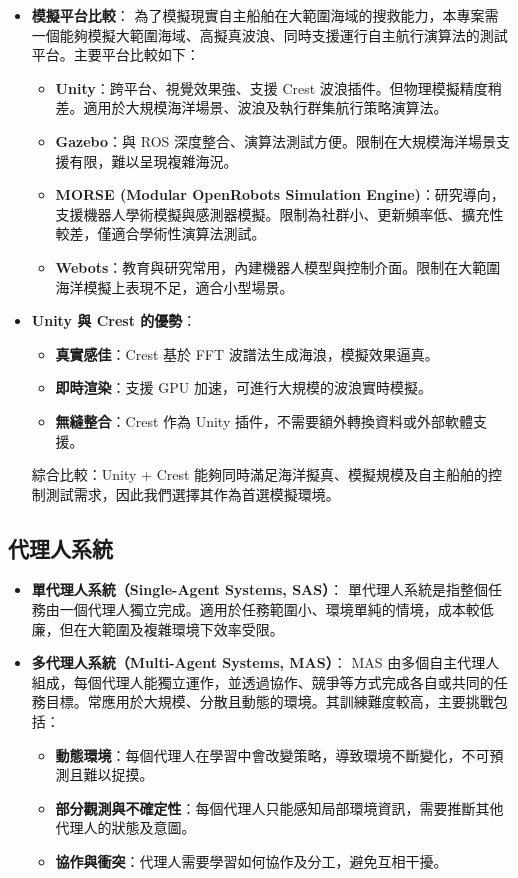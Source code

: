 \documentclass[12pt,a4paper]{article}
\begin{document}
	\begin{itemize}
	  \item \textbf{模擬平台比較}：
	  為了模擬現實自主船舶在大範圍海域的搜救能力，本專案需一個能夠模擬大範圍海域、高擬真波浪、同時支援運行自主航行演算法的測試平台。主要平台比較如下：
	  \begin{itemize}
	    \item \textbf{Unity}：跨平台、視覺效果強、支援 Crest 波浪插件。但物理模擬精度稍差。適用於大規模海洋場景、波浪及執行群集航行策略演算法。
	    \item \textbf{Gazebo}：與 ROS 深度整合、演算法測試方便。限制在大規模海洋場景支援有限，難以呈現複雜海況。
	    \item \textbf{MORSE (Modular OpenRobots Simulation Engine)}：研究導向，支援機器人學術模擬與感測器模擬。限制為社群小、更新頻率低、擴充性較差，僅適合學術性演算法測試。
	    \item \textbf{Webots}：教育與研究常用，內建機器人模型與控制介面。限制在大範圍海洋模擬上表現不足，適合小型場景。
	  \end{itemize}
	  
	  \item \textbf{Unity 與 Crest 的優勢}：
	  \begin{itemize}
	    \item \textbf{真實感佳}：Crest 基於 FFT 波譜法生成海浪，模擬效果逼真。
	    \item \textbf{即時渲染}：支援 GPU 加速，可進行大規模的波浪實時模擬。
	    \item \textbf{無縫整合}：Crest 作為 Unity 插件，不需要額外轉換資料或外部軟體支援。
	  \end{itemize}
	  綜合比較：Unity + Crest 能夠同時滿足海洋擬真、模擬規模及自主船舶的控制測試需求，因此我們選擇其作為首選模擬環境。
	\end{itemize} 
\fi

\subsection{代理人系統}

\begin{itemize}
  \item \textbf{單代理人系統（Single-Agent Systems, SAS）}：
  單代理人系統是指整個任務由一個代理人獨立完成。適用於任務範圍小、環境單純的情境，成本較低廉，但在大範圍及複雜環境下效率受限。
  
  \item \textbf{多代理人系統（Multi-Agent Systems, MAS）}：
  MAS 由多個自主代理人組成，每個代理人能獨立運作，並透過協作、競爭等方式完成各自或共同的任務目標。常應用於大規模、分散且動態的環境。其訓練難度較高，主要挑戰包括：
  \begin{itemize}
    \item \textbf{動態環境}：每個代理人在學習中會改變策略，導致環境不斷變化，不可預測且難以捉摸。
    \item \textbf{部分觀測與不確定性}：每個代理人只能感知局部環境資訊，需要推斷其他代理人的狀態及意圖。
    \item \textbf{協作與衝突}：代理人需要學習如何協作及分工，避免互相干擾。
  \end{itemize}
\end{itemize}
\end{document}
